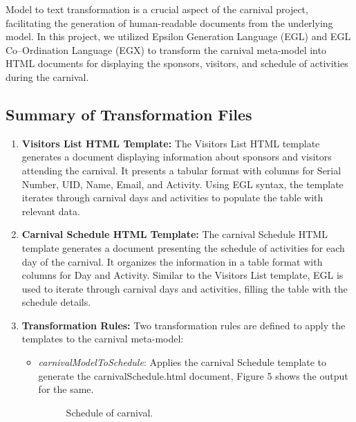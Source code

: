 \documentclass[a4paper,11pt]{report}
\begin{document}
Model to text transformation is a crucial aspect of the carnival project, facilitating the generation of human-readable documents from the underlying model. In this project, we utilized Epsilon Generation Language (EGL)\cite{1} and EGL Co--Ordination Language (EGX)\cite{2} to transform the carnival meta-model into HTML documents for displaying the sponsors, visitors, and schedule of activities during the carnival.

\subsection{Summary of Transformation Files}
\begin{enumerate}[leftmargin=*]
\item {\bf Visitors List HTML Template:} The Visitors List HTML template generates a document displaying information about sponsors and visitors attending the carnival. It presents a tabular format with columns for Serial Number, UID, Name, Email, and Activity. Using EGL syntax, the template iterates through carnival days and activities to populate the table with relevant data.

\item {\bf Carnival Schedule HTML Template:} The carnival Schedule HTML template generates a document presenting the schedule of activities for each day of the carnival. It organizes the information in a table format with columns for Day and Activity. Similar to the Visitors List template, EGL is used to iterate through carnival days and activities, filling the table with the schedule details.

\item {\bf Transformation Rules:} Two transformation rules are defined to apply the templates to the carnival meta-model:
\begin{itemize}[leftmargin=*]
	\item {\it carnivalModelToSchedule}: Applies the carnival Schedule template to generate the carnivalSchedule.html document, Figure 5 shows the output for the same.
\begin{figure}[h]
	\begin{center}
		\caption{{\footnotesize Schedule of carnival. }}
		\label{Fig5}
	\end{center}
\end{figure}	


\end{itemize}
\end{enumerate}
\end{document}
